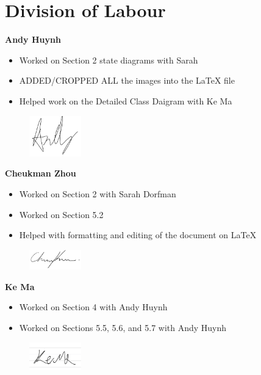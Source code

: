 \appendix
\section{Division of Labour}
\label{sec:division_of_labour}

\textbf{Andy Huynh}
\begin{itemize}
    \item Worked on Section 2 state diagrams with Sarah
    \item ADDED/CROPPED ALL the images into the LaTeX file
    \item Helped work on the Detailed Class Daigram with Ke Ma
\end{itemize}
\begin{figure}[H]
	\centering
	\includegraphics[width=0.2\textwidth]{Signatures/a.png}  
\end{figure}

\textbf{Cheukman Zhou}
\begin{itemize}
    \item Worked on Section 2 with Sarah Dorfman
    \item Worked on Section 5.2
    \item Helped with formatting and editing of the document on LaTeX
\end{itemize}
\begin{figure}[H]
	\centering
	\includegraphics[width=0.2\textwidth]{Signatures/c.png}
\end{figure}

\textbf{Ke Ma}
\begin{itemize}
    \item Worked on Section 4 with Andy Huynh
    \item Worked on Sections 5.5, 5.6, and 5.7 with Andy Huynh
\end{itemize}
\begin{figure}[H]
	\centering
	\includegraphics[width=0.2\textwidth]{Signatures/k.png}
\end{figure}


